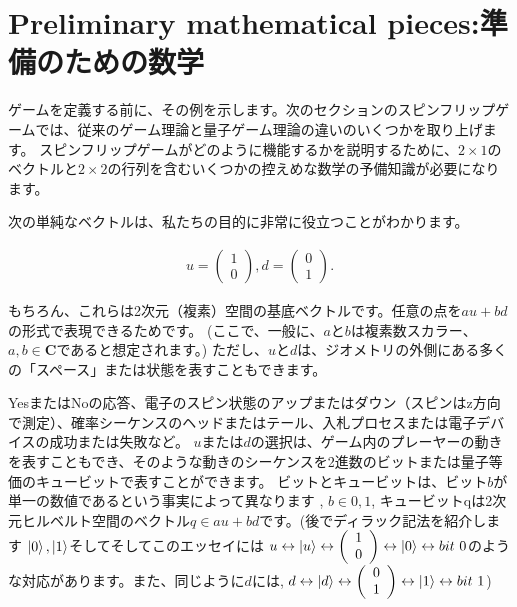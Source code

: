 \section{Preliminary mathematical pieces:準備のための数学}

ゲームを定義する前に、その例を示します。次のセクションのスピンフリップゲームでは、従来のゲーム理論と量子ゲーム理論の違いのいくつかを取り上げます。
スピンフリップゲームがどのように機能するかを説明するために、$2 \times 1$のベクトルと$2 \times 2$の行列を含むいくつかの控えめな数学の予備知識が必要になります。

次の単純なベクトルは、私たちの目的に非常に役立つことがわかります。

\begin{eqnarray}
\label{9}
u = \left(  
\begin{array}{ccc}
 1 \\
 0 
\end{array}
\right) 
,
d = \left(  
\begin{array}{ccc}
 0 \\
 1 
\end{array}
\right).
\end{eqnarray}

もちろん、これらは2次元（複素）空間の基底ベクトルです。任意の点を$au + bd$の形式で表現できるためです。
(ここで、一般に、$a$と$b$は複素数スカラー、$a,b \in \mathbf{C}$であると想定されます。)
ただし、$u$と$d$は、ジオメトリの外側にある多くの「スペース」または状態を表すこともできます。

YesまたはNoの応答、電子のスピン状態のアップまたはダウン（スピンはz方向で測定）、確率シーケンスのヘッドまたはテール、入札プロセスまたは電子デバイスの成功または失敗など。
 $u$または$d$の選択は、ゲーム内のプレーヤーの動きを表すこともでき、そのような動きのシーケンスを2進数のビットまたは量子等価のキュービットで表すことができます。
ビットとキュービットは、ビット$b$が単一の数値であるという事実によって異なります
, $b \in {0,1}$, キュービットqは2次元ヒルベルト空間のベクトル$q \in {au + bd}$です。(後でディラック記法を紹介します $\ket{0},\ket{1}$そしてそしてこのエッセイには $ u \leftrightarrow \ket{u} \leftrightarrow \left(  
\begin{array}{ccc}
 1 \\
 0 
\end{array}
\right) \leftrightarrow \ket{0} \leftrightarrow bit \ 0 $のような対応があります。また、同じように$d$には,
$ d \leftrightarrow \ket{d} \leftrightarrow \left(  
\begin{array}{ccc}
 0 \\
 1 
\end{array}
\right) \leftrightarrow \ket{1} \leftrightarrow bit \ 1 $)

